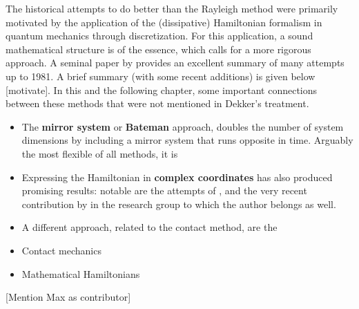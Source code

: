 The historical attempts to do better than the Rayleigh method were primarily motivated by the application of the (dissipative) Hamiltonian formalism in quantum mechanics through discretization. For this application, a sound mathematical structure is of the essence, which calls for a more rigorous approach. A seminal paper by \citet{Dekker1981} provides an excellent summary of many attempts up to 1981. A brief summary (with some recent additions) is given below [motivate]. In this and the following chapter, some important connections between these methods that were not mentioned in Dekker's treatment.
\begin{itemize}
    \item The \textbf{mirror system} or \textbf{Bateman} approach, doubles the number of system dimensions by including a mirror system that runs opposite in time. Arguably the most flexible of all methods, it is 
    \item Expressing the Hamiltonian in \textbf{complex coordinates} has also produced promising results: notable are the attempts of \citet{Bopp1974}, \citet{Dedene1980} and the very recent contribution by \citet{Hutters2020b} in the research group to which the author belongs as well.
    \item A different approach, related to the contact method, are the 
    \item Contact mechanics
    \item Mathematical Hamiltonians
\end{itemize}

[Mention Max as contributor]
